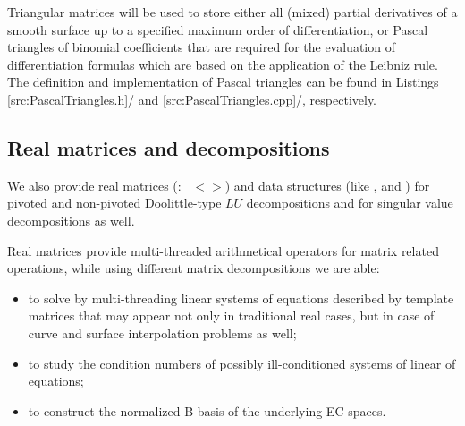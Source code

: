 \documentclass[b5paper, twosided]{book}
\newcommand{\CRed}[1]{{\color[rgb]{0.5, 0.0, 0.0}{#1}}}
\newcommand{\CBlue}[1]{{\color[rgb]{0.0, 0.0, 0.9}{#1}}}
\DeclareRobustCommand{\mref}[1]{\ref{#1}{\relsize{-1}/\pageref{#1}}}
\begin{document}

Triangular matrices will be used to store either all (mixed) partial derivatives of a smooth surface up to a specified maximum order of differentiation, or Pascal triangles of binomial coefficients that are required for the evaluation of differentiation formulas which are based on the application of the Leibniz rule. The definition and implementation of Pascal triangles can be found in Listings \mref{src:PascalTriangles.h} and \mref{src:PascalTriangles.cpp}, respectively.



\subsection{Real matrices and decompositions}

We also provide real matrices (\CBlue{RealMatrix}:\ \CRed{public} \CBlue{Matrix}$<$\CRed{double}$>$) and data structures (like \CBlue{PLUDecomposition}, \CBlue{Factorized\-Un\-piv\-o\-ted\-LU\-Decomposition} and \CBlue{SVDecomposition}) for pivoted and non-pivoted Doolittle-type $LU$ decompositions and for singular value decompositions as well.

Real matrices provide multi-threaded arithmetical operators for matrix related operations, while using different matrix decompositions we are able:
\begin{itemize}
    \item to solve by multi-threading linear systems of equations described by template matrices that may appear not only in traditional real cases, but in case of curve and surface interpolation problems as well;
    
    \item to study the condition numbers of possibly ill-conditioned systems of linear of equations;
    
    \item to construct the normalized B-basis of the underlying EC spaces.
\end{itemize}
\end{document}

